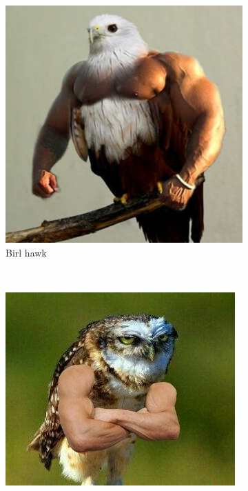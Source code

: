 \documentclass[12pt]{article}
\begin{document}
		\begin{figure}[H]
			\centering
			\caption[Legenda curta do birb BIRL]{Legenda longa do birb BIRL}
			\begin{subfigure}[b]{0.3\textwidth}
				\includegraphics[width=\linewidth]{figuras/birb_02a}
				\caption{Birl hawk}
				\label{fig:birlhawk}
			\end{subfigure}
			~ %
			\begin{subfigure}[b]{0.3\textwidth}
				\includegraphics[width=\linewidth]{figuras/birb_02b}

\end{subfigure}
\end{figure}
\end{document}
